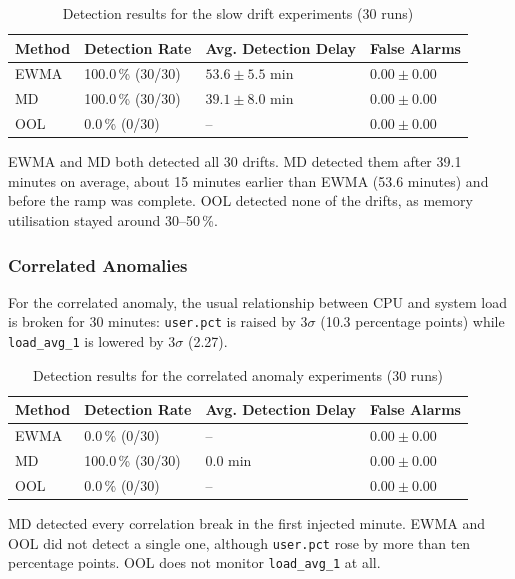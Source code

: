 \begin{table}[H]
\centering
\begin{tabularx}{\textwidth}{p{3.5cm}XXX}
\toprule
\textbf{Method} & \textbf{Detection Rate} & \textbf{Avg. Detection Delay} & \textbf{False Alarms} \\
\midrule
EWMA & 100.0\,\% (30/30) & $53.6 \pm 5.5$ min & $0.00 \pm 0.00$ \\
MD   & 100.0\,\% (30/30) & $39.1 \pm 8.0$ min & $0.00 \pm 0.00$ \\
OOL  & 0.0\,\% (0/30)    & --                 & $0.00 \pm 0.00$ \\
\bottomrule
\end{tabularx}
\caption{Detection results for the slow drift experiments (30 runs)}
\label{tab:slow_drift_results}
\end{table}

EWMA and MD both detected all 30 drifts. MD detected them after 39.1 minutes on average, about 15 minutes earlier than EWMA (53.6 minutes) and before the ramp was complete. OOL detected none of the drifts, as memory utilisation stayed around 30--50\,\%.

\subsubsection{Correlated Anomalies}
For the correlated anomaly, the usual relationship between CPU and system load is broken for 30 minutes: \texttt{user.pct} is raised by $3\sigma$ (10.3 percentage points) while \texttt{load\_avg\_1} is lowered by $3\sigma$ (2.27).

\begin{table}[H]
\centering
\begin{tabularx}{\textwidth}{p{3.5cm}XXX}
\toprule
\textbf{Method} & \textbf{Detection Rate} & \textbf{Avg. Detection Delay} & \textbf{False Alarms} \\
\midrule
EWMA & 0.0\,\% (0/30)    & --      & $0.00 \pm 0.00$ \\
MD   & 100.0\,\% (30/30) & 0.0 min & $0.00 \pm 0.00$ \\
OOL  & 0.0\,\% (0/30)    & --      & $0.00 \pm 0.00$ \\
\bottomrule
\end{tabularx}
\caption{Detection results for the correlated anomaly experiments (30 runs)}
\label{tab:correlated_results}
\end{table}

MD detected every correlation break in the first injected minute. EWMA and OOL did not detect a single one, although \texttt{user.pct} rose by more than ten percentage points. OOL does not monitor \texttt{load\_avg\_1} at all.


